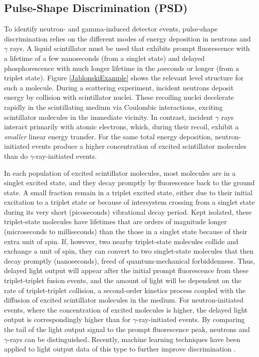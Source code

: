 \subsection{Pulse-Shape Discrimination (PSD)}
To identify neutron- and gamma-induced detector events, pulse-shape discrimination
relies on the different modes of energy deposition in neutrons and $\gamma$ rays.
A liquid scintillator must be used that exhibits prompt fluorescence with a
lifetime of a few nanoseconds (from a singlet
state) and delayed phosphorescence with much longer lifetime in the $\mu$seconds
or longer (from a triplet state). Figure \ref{JablonskiExample} shows the
relevant level structure for such a molecule. During a scattering experiment,
incident neutrons deposit energy by collision with scintillator nuclei.
These recoiling nuclei decelerate rapidly in the scintillating
medium via Coulombic interactions, exciting scintillator molecules in the
immediate vicinity. In contrast, incident $\gamma$ rays interact primarily with
atomic electrons, which, during their recoil, exhibit a \textit{smaller} linear energy
transfer. For the same total energy deposition, neutron-initiated events produce a higher 
concentration of excited scintillator molecules than do $\gamma$-ray-initiated
events.

In each population of excited scintillator molecules, most molecules are in a
singlet excited state, and they decay promptly by fluorescence back to the
ground state. A small fraction remain in a triplet excited state,
either due to their initial excitation to a
triplet state or because of intersystem crossing from a singlet state during its
very short (picoseconds) vibrational decay period. Kept isolated, these
triplet-state molecules have lifetimes that are orders of magnitude longer
(microseconds to milliseconds) than the those in a singlet state because of their extra unit of 
spin. If, however, two nearby triplet-state
molecules collide and exchange a unit of spin, they can convert to two singlet-state
molecules that then decay promptly (nanoseconds), freed of quantum-mechanical forbiddenness.
Thus, delayed light output will appear after the initial prompt fluorescence
from these triplet-triplet fusion events, and the amount of light will be
dependent on the rate of triplet-triplet collision, a second-order kinetics
process coupled with the diffusion of excited scintillator molecules in the
medium. For neutron-initiated events, where the concentration of excited molecules is
higher, the delayed light output is correspondingly higher than for $\gamma$-ray-initiated
events. By comparing the tail of the light output signal to the prompt
fluorescence peak, neutrons and $\gamma$-rays can be distinguished.
Recently, machine learning techniques have been
applied to light output data of this type to further improve discrimination \cite{Doucet2018}.

